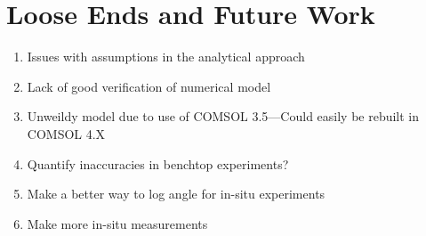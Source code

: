 \chapter{Loose Ends and Future Work}

\begin{enumerate}
\item Issues with assumptions in the analytical approach
\item Lack of good verification of numerical model
\item Unweildy model due to use of COMSOL 3.5---Could easily be rebuilt in
COMSOL 4.X
\item Quantify inaccuracies in benchtop experiments?
\item Make a better way to log angle for in-situ experiments
\item Make more in-situ measurements
\end{enumerate}
